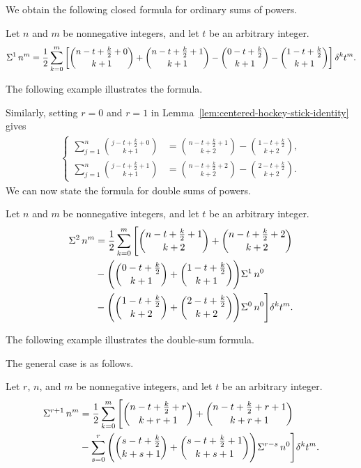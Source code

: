 We obtain the following closed formula for ordinary sums of powers.
\begin{proposition}
  \label{prop:ordinary-sums-of-powers}
  Let $n$ and $m$ be nonnegative integers, and let $t$ be an arbitrary integer.
  \begin{align*}
    \Sigma^{1}\,{n}^{m}
    = \frac{1}{2}
    \sum_{k=0}^{m}
    \left[
      \binom{n -t + \frac{k}{2} +0}{k+1} + \binom{n -t + \frac{k}{2} +1}{k+1} - \binom{0 -t + \tfrac{k}{2}}{k+1}
      - \binom{1 -t + \tfrac{k}{2}}{k+1}
    \right] \delta^{k} t^m.
  \end{align*}
\end{proposition}
The following example illustrates the formula.

Similarly, setting $r=0$ and $r=1$ in Lemma~\eqref{lem:centered-hockey-stick-identity} gives
\begin{align*}
  \begin{cases}
    \sum_{j=1}^{n} \binom{j -t + \frac{k}{2} +0}{k+1} &= \binom{n -t + \frac{k}{2} +1}{k+2} - \binom{1 -t + \tfrac{k}{2}}{k+2}, \\
    \sum_{j=1}^{n} \binom{j -t + \frac{k}{2} +1}{k+1} &= \binom{n -t + \frac{k}{2} + 2}{k+2} - \binom{2 -t + \tfrac{k}{2}}{k+2}.
  \end{cases}
\end{align*}
We can now state the formula for double sums of powers.
\begin{proposition}
  \label{prop:double-sums-of-powers}
  Let $n$ and $m$ be nonnegative integers, and let $t$ be an arbitrary integer.
  \begin{align*}
    \Sigma^{2}\,{n}^{m}
    &= \frac{1}{2}
    \sum_{k=0}^{m}
    \Bigg[
      \binom{n -t + \frac{k}{2} +1}{k+2}
      +\binom{n -t + \frac{k}{2} + 2}{k+2} \\
      &-
      \Bigg(
        \binom{0 -t + \tfrac{k}{2}}{k+1}
        +\binom{1 -t + \tfrac{k}{2}}{k+1}
      \Bigg) \Sigma^{1}\,{n}^{0} \\
      &-
      \Bigg(
        \binom{1 -t + \tfrac{k}{2}}{k+2}
        +\binom{2 -t + \tfrac{k}{2}}{k+2}
      \Bigg) \Sigma^{0}\,{n}^{0}
    \Bigg] \delta^{k} t^m.
  \end{align*}
\end{proposition}
The following example illustrates the double-sum formula.

The general case is as follows.
\begin{theorem}
  \label{thm:multifold-sums-of-powers}
  Let $r$, $n$, and $m$ be nonnegative integers, and let $t$ be an arbitrary integer.
  \begin{align*}
    \Sigma^{r+1}\,{n}^{m}
    &= \frac{1}{2}
    \sum_{k=0}^{m}
    \Bigg[
      \binom{n-t+\frac{k}{2}+r}{k+r+1}
      +
      \binom{n-t+\frac{k}{2}+r+1}{k+r+1} \\
      &-
      \sum_{s=0}^{r}
      \Bigg(
        \binom{s-t+\frac{k}{2}}{k+s+1}
        +
        \binom{s-t+\frac{k}{2}+1}{k+s+1}
      \Bigg) \Sigma^{r-s}\,{n}^{0}
    \Bigg] \delta^{k} t^{m}.
  \end{align*}
\end{theorem}
